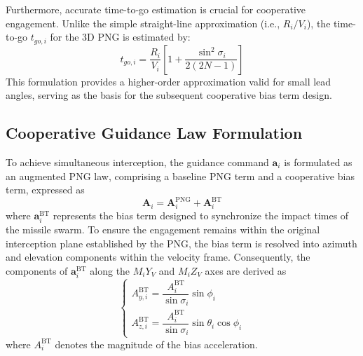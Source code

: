 \documentclass[lettersize,journal]{IEEEtran}
\begin{document}
Furthermore, accurate time-to-go estimation is crucial for cooperative engagement. Unlike the simple straight-line approximation (i.e., $R_i/V_i$), the time-to-go $t_{go,i}$ for the 3D PNG is estimated by:
\begin{equation}
	\label{eq:tgo_estimate}
	t_{go,i} = \frac{{{R_i}}}{{{V_i}}}\left[ {1 + \frac{{{{\sin }^2}{\sigma _i}}}{{2(2N - 1)}}} \right]
\end{equation}
This formulation provides a higher-order approximation valid for small lead angles, serving as the basis for the subsequent cooperative bias term design.
\subsection{Cooperative Guidance Law Formulation}
To achieve simultaneous interception, the guidance command $\mathbf{a}_i$ is formulated as an augmented PNG law, comprising a baseline PNG term and a cooperative bias term, expressed as
\begin{equation}
	\label{eq:total_guidance}
	\boldsymbol{A}_i = \boldsymbol{A}_i^{{\mathrm{PNG}}} + \boldsymbol{A}_i^{{\mathrm{BT}}}
\end{equation}
where $\mathbf{a}_i^{{\mathrm{BT}}}$ represents the bias term designed to synchronize the impact times of the missile swarm. To ensure the engagement remains within the original interception plane established by the PNG, the bias term is resolved into azimuth and elevation components within the velocity frame. Consequently, the components of $\mathbf{a}_i^{{\mathrm{BT}}}$ along the $M_i Y_V$ and $M_i Z_V$ axes are derived as
\begin{equation}
	\label{eq:bias_components}
	\begin{cases}
		A_{y,i}^{{\mathrm{BT}}} = \dfrac{A_i^{{\mathrm{BT}}}}{\sin \sigma_i} \sin \phi_i \\
		A_{z,i}^{{\mathrm{BT}}} = \dfrac{A_i^{{\mathrm{BT}}}}{\sin \sigma_i} \sin \theta_i \cos \phi_i
	\end{cases}
\end{equation}
where $A_i^{{\mathrm{BT}}}$ denotes the magnitude of the bias acceleration.
\end{document}
